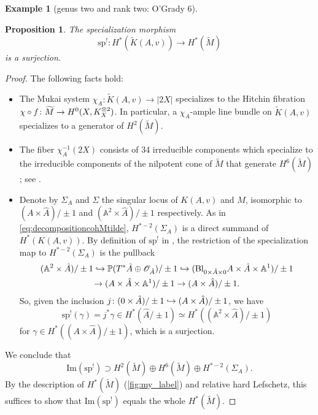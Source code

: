 \documentclass[JEP,XML,SOM,Unicode, NoEqCountersInSection,NoFloatCountersInSection,published]{cedram}
\let\mathcal\mathscr
\newcommand\hto{\mathrel{\lhook\joinrel\to}}
\newtheorem{prop}[thm]{Proposition}
\theoremstyle{definition}
\newtheorem{exa}[thm]{Example}
\newcommand{\Aff}{\mathbb{A}}
\newcommand{\PP}{\mathbb{P}}
\newcommand{\spmap}{\mathrm{sp}^{!}}
\begin{document}
\begin{exa}[genus two and rank two: O'Grady 6]
\begin{prop}\label{prop:surjspeci}
The specialization morphism \emph{\cite[(86)]{deCataldoMaulikShen2019}}
\[
\spmap \colon H^*(\widetilde{K}(A,v)) \to H^*(\widetilde{M})
\]
is a surjection.
\end{prop}
\begin{proof}The following facts hold:
\begin{itemize}
\item The Mukai system $\chi_A \colon \widetilde{K}(A,v) \to |2X|$ specializes to the Hitchin fibration $\chi \circ\nobreak f \colon \widetilde{M} \to H^0(X,K^{\otimes 2}_X)$. In particular, a $\chi_A$-ample line bundle on $\widetilde{K}(A,v)$ specia\-lizes to a generator of $H^2(\widetilde{M})$.
\item The fiber $\chi_A^{-1}(2X)$ consists of 34 irreducible components which specialize to the irreducible components of the nilpotent cone of $\widetilde{M}$ that generate $H^6(\widetilde{M})$; see \cite[Prop.\,3.0.3]{Wu2021}.
\item Denote by $\Sigma_A$ and $\Sigma$ the singular locus of ${K}(A,v)$ and $M$, isomorphic to \hbox{$(A \times \hat{A})/\pm 1$} and $(\Aff^2 \times \hat{A})/\pm 1$ respectively. As in \eqref{eq:decompositioncohMtilde}, $H^{*-2}(\Sigma_A)$ is a direct summand of $H^*(K(A,v))$. By definition of $\spmap$ in \cite[(86)]{deCataldoMaulikShen2019}, the restriction of the specialization map to $H^{*-2}(\Sigma_A)$ is the pullback
\begin{multline*}
(\Aff^2 \times \hat{A})/\pm 1 \hto \PP(T^*\hat{A} \oplus \mathcal{O}_{\hat{A}})/\pm 1 \hto (\mathrm{Bl}_{0 \times \hat{A} \times 0}A \times \hat{A} \times \Aff^1)/\pm 1 \\
\to (A \times \hat{A} \times \Aff^1)/\pm 1 \to (A \times \hat{A})/\pm 1.
\end{multline*}
So, given the inclusion $j \colon (0 \times \hat{A})/\pm 1 \hto (A \times \hat{A})/\pm 1$, we have
\[
\spmap(\gamma)=j^*\gamma \in H^*( \hat{A}/\pm 1)\simeq H^*( (\Aff^2 \times \hat{A})/\pm 1)
\]
for $\gamma \in H^*((A \times \hat{A})/\pm 1)$, which is a surjection.
\end{itemize}
We conclude that
\[
\mathrm{Im}(\spmap) \supset H^2(\widetilde{M}) \oplus H^6(\widetilde{M}) \oplus H^{*-2}(\Sigma_A).
\]
By the description of $H^*(\widetilde{M})$ (\cf \cref{fig:my_label}) and relative hard Lefschetz, this suffices to show that $\mathrm{Im}(\spmap)$ equals the whole $H^*(\widetilde{M})$.
\end{proof}
\end{exa}
\end{document}
